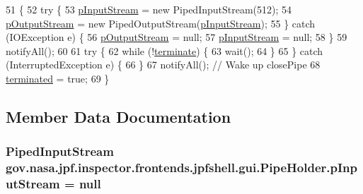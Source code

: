 \begin{DoxyCode}
51                                   \{
52     \textcolor{keywordflow}{try} \{
53       \hyperlink{classgov_1_1nasa_1_1jpf_1_1inspector_1_1frontends_1_1jpfshell_1_1gui_1_1_pipe_holder_abf21e9472fadcfa9b794922d8c551888}{pInputStream} = \textcolor{keyword}{new} PipedInputStream(512);
54       \hyperlink{classgov_1_1nasa_1_1jpf_1_1inspector_1_1frontends_1_1jpfshell_1_1gui_1_1_pipe_holder_a5eb3b6e8d754f8d1db7c96fd33e2247c}{pOutputStream} = \textcolor{keyword}{new} PipedOutputStream(\hyperlink{classgov_1_1nasa_1_1jpf_1_1inspector_1_1frontends_1_1jpfshell_1_1gui_1_1_pipe_holder_abf21e9472fadcfa9b794922d8c551888}{pInputStream});
55     \} \textcolor{keywordflow}{catch} (IOException e) \{
56       \hyperlink{classgov_1_1nasa_1_1jpf_1_1inspector_1_1frontends_1_1jpfshell_1_1gui_1_1_pipe_holder_a5eb3b6e8d754f8d1db7c96fd33e2247c}{pOutputStream} = null;
57       \hyperlink{classgov_1_1nasa_1_1jpf_1_1inspector_1_1frontends_1_1jpfshell_1_1gui_1_1_pipe_holder_abf21e9472fadcfa9b794922d8c551888}{pInputStream} = null;
58     \}
59     notifyAll();
60 
61     \textcolor{keywordflow}{try} \{
62       \textcolor{keywordflow}{while} (!\hyperlink{classgov_1_1nasa_1_1jpf_1_1inspector_1_1frontends_1_1jpfshell_1_1gui_1_1_pipe_holder_af2120fd734f9d7590aab10e3d678890b}{terminate}) \{
63         wait();
64       \}
65     \} \textcolor{keywordflow}{catch} (InterruptedException e) \{
66     \}
67     notifyAll(); \textcolor{comment}{// Wake up closePipe}
68     \hyperlink{classgov_1_1nasa_1_1jpf_1_1inspector_1_1frontends_1_1jpfshell_1_1gui_1_1_pipe_holder_ad79f1e1825f9b81ca68005ff84b1ce7f}{terminated} = \textcolor{keyword}{true};
69   \}
\end{DoxyCode}


\subsection{Member Data Documentation}
\subsubsection[{\texorpdfstring{p\+Input\+Stream}{pInputStream}}]{\setlength{\rightskip}{0pt plus 5cm}Piped\+Input\+Stream gov.\+nasa.\+jpf.\+inspector.\+frontends.\+jpfshell.\+gui.\+Pipe\+Holder.\+p\+Input\+Stream = null\hspace{0.3cm}{\ttfamily [private]}}\hypertarget{classgov_1_1nasa_1_1jpf_1_1inspector_1_1frontends_1_1jpfshell_1_1gui_1_1_pipe_holder_abf21e9472fadcfa9b794922d8c551888}{}\label{classgov_1_1nasa_1_1jpf_1_1inspector_1_1frontends_1_1jpfshell_1_1gui_1_1_pipe_holder_abf21e9472fadcfa9b794922d8c551888}


